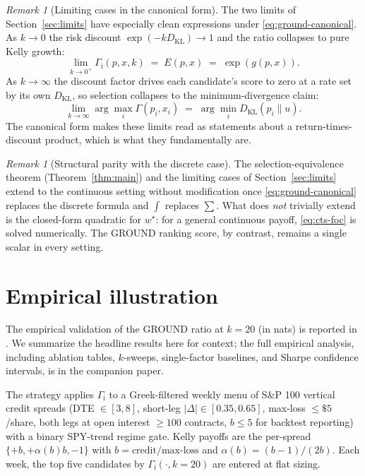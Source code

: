 \documentclass[11pt]{article}
\theoremstyle{definition}
\theoremstyle{remark}
\newtheorem{remark}[theorem]{Remark}
\newcommand{\G}{g}
\newcommand{\KL}{D_{\mathrm{KL}}}
\newcommand{\GROUND}{\Gamma_{\mathrm{i}}}
\begin{document}
\begin{remark}[Limiting cases in the canonical form]
\label{rem:limits-canonical}
The two limits of Section~\ref{sec:limits} have especially clean
expressions under \eqref{eq:ground-canonical}. As $k \to 0$ the risk
discount $\exp(-k \KL) \to 1$ and the ratio collapses to pure Kelly
growth:
\begin{equation*}
\lim_{k \to 0^+} \GROUND(p, x, k) \;=\; E(p, x) \;=\; \exp(\G(p, x)).
\end{equation*}
As $k \to \infty$ the discount factor drives each candidate's score
to zero at a rate set by its own $\KL$, so selection collapses to
the minimum-divergence claim:
\begin{equation*}
\lim_{k \to \infty} \arg\max_i \Gamma(p_i, x_i)
   \;=\; \arg\min_i \KL(p_i \| u).
\end{equation*}
The canonical form makes these limits read as statements about a
return-times-discount product, which is what they fundamentally are.
\end{remark}

\begin{remark}[Structural parity with the discrete case]
The selection-equivalence theorem (Theorem~\ref{thm:main}) and the
limiting cases of Section~\ref{sec:limits} extend to the continuous
setting without modification once \eqref{eq:ground-canonical}
replaces the discrete formula and $\int$ replaces $\sum$. What does
\emph{not} trivially extend is the closed-form quadratic for
$w^\star$: for a general continuous payoff, \eqref{eq:cts-foc} is
solved numerically. The GROUND ranking score, by contrast, remains
a single scalar in every setting.
\end{remark}


\section{Empirical illustration}\label{sec:empirical}

The empirical validation of the GROUND ratio at $k = 20$ (in nats)
is reported in \citet{mercurio2026empirical}. We summarize the
headline results here for context; the full empirical analysis,
including ablation tables, $k$-sweeps, single-factor baselines, and
Sharpe confidence intervals, is in the companion paper.

The strategy applies $\GROUND$ to a Greek-filtered weekly menu of
S\&P 100 vertical credit spreads (DTE $\in [3, 8]$, short-leg
$|\Delta| \in [0.35, 0.65]$, max-loss $\le \$5$/share, both legs at
open interest $\ge 100$ contracts, $b \le 5$ for backtest reporting)
with a binary SPY-trend regime gate. Kelly payoffs are the per-spread
$\{+b, +\alpha(b) b, -1\}$ with $b = \text{credit}/\text{max-loss}$
and $\alpha(b) = (b-1)/(2b)$. Each week, the top five candidates by
$\GROUND(\cdot, k{=}20)$ are entered at flat sizing.
\end{document}
